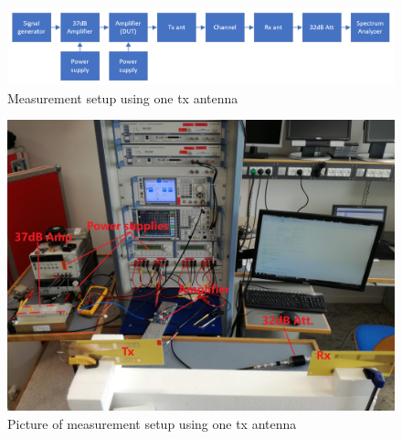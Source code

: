 \begin{figure}[H]
\centering 
\includegraphics[scale = 0.5]{figures/measurement/cree/one2one_draw.png}
\caption{Measurement setup using one tx antenna}
\label{fig:Meas_setup_draw_cree1}
\end{figure} 


\begin{figure}[H]
\centering 
\includegraphics[scale = 0.1]{figures/measurement/cree/one2one.jpg}
\caption{Picture of measurement setup using one tx antenna}
\label{fig:Meas_setup_cree1}
\end{figure} 


